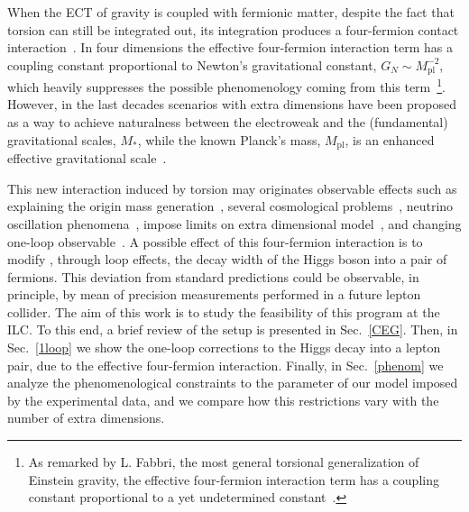 \documentclass[twocolumn,aps,prd,showkeys,showpacs,groupedaddress]{revtex4-1}
\begin{document}
When the ECT of gravity is coupled with fermionic matter, despite the fact that torsion can still be integrated out, its integration produces a four-fermion contact interaction~\cite{Kibble:1961ba,RevModPhys.48.393,Shapiro:2001rz,SUGRA-book,Castillo-Felisola:2013jva}. In four dimensions the effective four-fermion interaction term has a coupling constant proportional to Newton's gravitational constant, $G_N\sim M_{\text{pl}}^{-2}$, which heavily suppresses the possible phenomenology coming from this term~\footnote{As remarked by L. Fabbri, the most general torsional generalization of Einstein gravity, the effective four-fermion interaction term has a coupling constant proportional to a yet undetermined constant~\cite{Fabbri:2011kq}.}. However, in the last decades scenarios with extra dimensions have been proposed as a way to achieve naturalness between the electroweak and the (fundamental) gravitational scales, $M_*$, while the known Planck's mass, $M_{\text{pl}}$, is an enhanced effective gravitational scale~\cite{ADD1,*AADD,*ADD2,RS1,*RS2}.



This new interaction induced by torsion may originates observable effects such as explaining the origin mass generation~\cite{Castillo-Felisola:2013jva}, several cosmological problems~\cite{Poplawski:2010jv,*Poplawski:2010kb,*Poplawski:2011xf,*Poplawski:2011wj,*Fabbri:2012yg,*Vignolo:2014wva}, neutrino oscillation phenomena~\cite{Capozziello:2013dja}, impose limits on extra dimensional model~\cite{Chang:2000yw,*Lebedev:2002dp,*CCSZ,*Castillo-Felisola:2014iia}, and changing one-loop observable~\cite{Castillo-Felisola:2014xba}. A possible  effect of this four-fermion interaction is to modify , through loop effects, the decay width of the Higgs boson into a pair of fermions. This deviation from standard predictions could be observable, in principle, by mean of precision measurements performed in a future lepton collider. The  aim of this work is to study the feasibility of this program at the ILC. To this end, a brief review of the setup is presented in Sec.~\ref{CEG}. Then, in Sec.~\ref{1loop} we show the one-loop corrections to the Higgs decay into a lepton pair, due to the effective four-fermion interaction. Finally, in Sec.~\ref{phenom} we analyze the phenomenological constraints to the parameter of our model imposed by the experimental data, and we compare how this restrictions vary with the number of extra dimensions.
\end{document}
